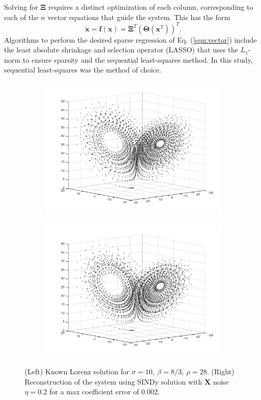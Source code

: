 \documentclass[%
 aip,12pt,
rsi,%
 amsmath,amssymb,
 reprint,%
]{revtex4-1}
\newcommand{\refe}[1]{Eq. (\ref{#1})}
\begin{document}
{Solving for $\bm{\Xi}$ requires a distinct optimization of each column, corresponding to each of the $n$ vector equations that guide the system. This has the form
\begin{equation} \label{eqn:vector}
  \bm{\dot{x}} = \bm{f}(\bm{x}) = \bm{\Xi}^T(\bm{\Theta}(\bm{x}^T))^T.
\end{equation}
Algorithms to perform the desired sparse regression of \refe{eqn:vector} include the least absolute shrinkage and selection operator (LASSO) \cite{LASSO} that uses the $L_1$-norm to ensure sparsity and the sequential least-squares method. In this study, sequential least-squares was the method of choice.


\begin{figure}[t]
\centering
\begin{subfigure}{.5\textwidth}
  \includegraphics[width=.8\linewidth]{L_A.png}
\end{subfigure}%
\begin{subfigure}{.5\textwidth}
  \includegraphics[width=.8\linewidth]{L_S.png}
\end{subfigure}
\caption{(Left) Known Lorenz solution for $\sigma=10, \ \beta=8/3, \ \rho=28$. (Right) Reconstruction of the system using SINDy solution with $\bm{\dot{X}}$ noise $\eta=0.2$ for a max coefficient error of 0.002. \label{fig:Lorenz}}
\end{figure}


}
\end{document}
